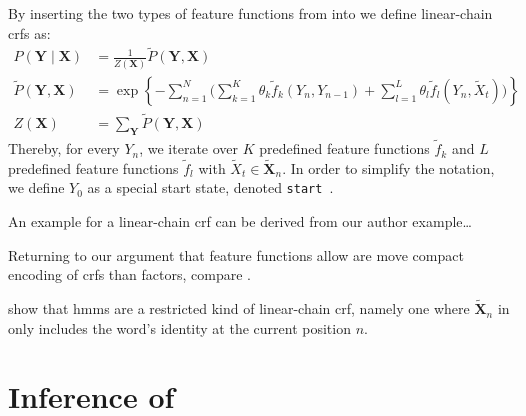 By inserting the two types of \glspl{feature function} from  into  we define \glspl{linear-chain crf} as:
\begin{equation}
  \label{equ:linear-chain-crf-log-linear}
  \begin{split}
    P(\bm{Y}\mid\bm{X}) & = \frac{1}{Z(\bm{X})}\tilde{P}(\bm{Y},\bm{X})  \\
    \tilde{P}(\bm{Y},\bm{X}) & = \exp\left\{ -\sum_{n=1}^N \Big(\sum_{k=1}^K\theta_k \tilde{f}_k(Y_n,Y_{n-1})+\sum_{l=1}^L\theta_l \tilde{f}_l(Y_n,\tilde{X}_t)\Big) \right\} \\
    Z(\bm{X}) & = \sum_{\bm{Y}}\tilde{P}(\bm{Y},\bm{X})
  \end{split}
\end{equation}
Thereby, for every $Y_n$, we iterate over $K$ predefined \glspl{feature function} $\tilde{f}_k$ and $L$ predefined \glspl{feature function} $\tilde{f}_l$ with $\tilde{X}_t\in\bm{\tilde{X}}_n$.
In order to simplify the notation, we define $Y_0$ as a special start state, denoted \texttt{start}~\citep{lafferty2001conditional}.

An example for a  \gls{linear-chain crf} can be derived from our author example\dots{}

Returning to our argument that \glspl{feature function} allow are move compact encoding of \glspl{crf} than \glspl{factor}, compare .

\citet{sutton2010introduction} show that \glspl{hmm} are a restricted kind of \gls{linear-chain crf}, namely one where $\bm{\tilde{X}}_n$ in  only includes the word's identity at the current position $n$.

\section{Inference of }\label{sec:inference-crfs}

